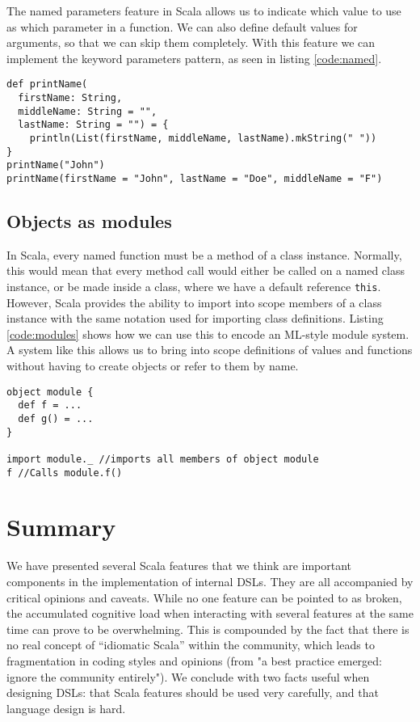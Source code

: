 The named parameters feature in Scala allows us to indicate which value to use as which parameter in a function.
We can also define default values for arguments, so that we can skip them completely.
With this feature we can implement the keyword parameters pattern, as seen in listing \ref{code:named}.

\begin{lstlisting}[caption=Named parameters and default arguments, label=code:named]
def printName(
  firstName: String,
  middleName: String = "",
  lastName: String = "") = {
    println(List(firstName, middleName, lastName).mkString(" "))
}
printName("John")
printName(firstName = "John", lastName = "Doe", middleName = "F")
\end{lstlisting}

\subsection{Objects as modules}

In Scala, every named function must be a method of a class instance.
Normally, this would mean that every method call would either be called on a named class instance, or be made inside a class, where we have a default reference \texttt{this}.
However, Scala provides the ability to import into scope members of a class instance with the same notation used for importing class definitions.
Listing \ref{code:modules} shows how we can use this to encode an ML-style module system.
A system like this allows us to bring into scope definitions of values and functions without having to create objects or refer to them by name.

\begin{lstlisting}[caption=Modules, label=code:modules, float]
object module {
  def f = ...
  def g() = ...
}

import module._ //imports all members of object module
f //Calls module.f()
\end{lstlisting}

\section{Summary}

We have presented several Scala features that we think are important components in the implementation of internal DSLs.
They are all accompanied by critical opinions and caveats.
While no one feature can be pointed to as broken, the accumulated cognitive load when interacting with several features at the same time can prove to be overwhelming.
This is compounded by the fact that there is no real concept of \enquote{idiomatic Scala} within the community, which leads to fragmentation in coding styles and opinions (from \cite{Hale:2011} "a best practice emerged: ignore the community entirely").
We conclude with two facts useful when designing DSLs: that Scala features should be used very carefully, and that language design is hard.
